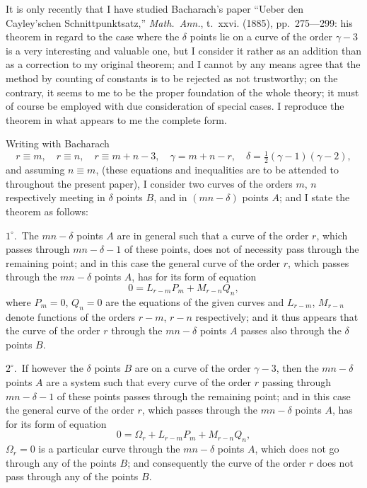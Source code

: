 \documentclass[11pt,a4paper]{book}
\begin{document}
It is only recently that I have studied Bacharach's paper ``Ueber den Cayley'schen
Schnittpunktsatz,'' \textit{Math.\ Ann.}, t.~xxvi. (1885), pp.~275---299: his theorem in regard
to the case where the $\delta$ points lie on a curve of the order $\gamma-3$ is a very
interesting and valuable one, but I consider it rather as an addition than as a
correction to my original theorem; and I cannot by any means agree that the
method by counting of constants is to be rejected as not trustworthy; on the
contrary, it seems to me to be the proper foundation of the whole theory; it must
of course be employed with due consideration of special cases. I reproduce the
theorem in what appears to me the complete form.

Writing with Bacharach
\[
r \equiv m, \quad r \equiv n, \quad r \equiv m + n - 3, \quad
\gamma = m + n - r, \quad \delta = \tfrac12(\gamma - 1)(\gamma - 2),
\]
and assuming $n \equiv m$, (these equations and inequalities are to be attended to throughout
the present paper), I consider two curves of the orders $m$, $n$ respectively meeting in
$\delta$ points $B$, and in $(mn - \delta)$ points $A$; and I state the theorem as follows:

$1^\circ$.\ The $mn - \delta$ points $A$ are in general such that a curve of the order $r$,
which passes through $mn - \delta - 1$ of these points, does not of necessity pass through
the remaining point; and in this case the general curve of the order $r$, which passes
through the $mn - \delta$ points $A$, has for its form of equation
\[
0 = L_{r-m} P_m + M_{r-n} Q_n,
\]
where $P_m = 0$, $Q_n = 0$ are the equations of the given curves and $L_{r-m}$, $M_{r-n}$ denote
functions of the orders $r-m$, $r-n$ respectively; and it thus appears that the curve
of the order $r$ through the $mn - \delta$ points $A$ passes also through the $\delta$ points $B$.

$2^\circ$.\ If however the $\delta$ points $B$ are on a curve of the order $\gamma - 3$, then the
$mn - \delta$ points $A$ are a system such that every curve of the order $r$ passing
through $mn - \delta - 1$ of these points passes through the remaining point; and in this
case the general curve of the order $r$, which passes through the $mn - \delta$ points $A$, has
for its form of equation
\[
0 = \Omega_r + L_{r-m} P_m + M_{r-n} Q_n,
\]
$\Omega_r = 0$ is a particular curve through the $mn - \delta$ points $A$, which does not go
through any of the points $B$; and consequently the curve of the order $r$ does not
pass through any of the points $B$.
\end{document}
